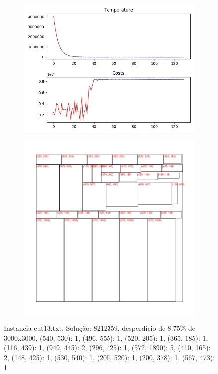 \begin{figure}
\centering
\begin{subfigure}{.5\textwidth}
  \centering
  \includegraphics[width=1\linewidth]{results/cut13/1/plot}
  \label{fig:sub1}
\end{subfigure}%
\begin{subfigure}{.5\textwidth}
  \centering
  \includegraphics[width=1\linewidth]{results/cut13/1/cut}
  \label{fig:sub2}
\end{subfigure}
\caption{Instancia cut13.txt, Solução: 8212359, desperdício de 8.75\% de 3000x3000, {(540, 530): 1, (496, 555): 1, (520, 205): 1, (365, 185): 1, (116, 439): 1, (949, 445): 2, (296, 425): 1, (572, 1890): 5, (410, 165): 2, (148, 425): 1, (530, 540): 1, (205, 520): 1, (200, 378): 1, (567, 473): 1}}
\label{fig:test}
\end{figure}

